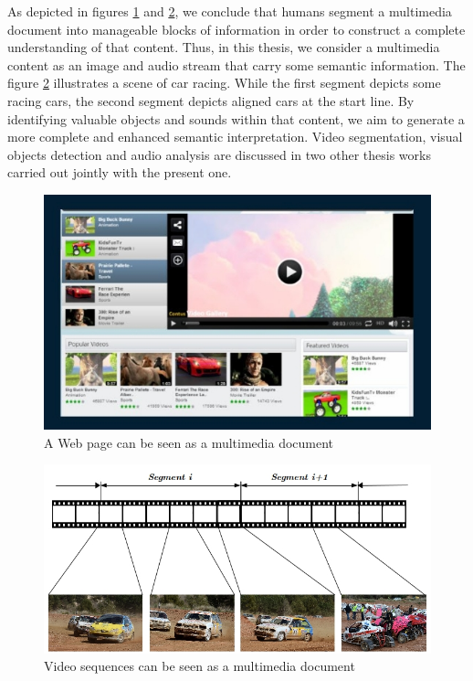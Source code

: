 	As depicted in figures \ref{state_fig2} and  \ref{state_fig3}, we conclude that humans segment a multimedia 
	document into manageable blocks of information in order to construct a complete understanding of 
	that content. Thus, in this thesis, we consider a multimedia content as an image and audio stream 
	that carry some semantic information. The figure \ref{state_fig3} illustrates a scene of car racing. 
	While the first segment depicts some racing cars, the second segment depicts aligned cars at the start 
	line. By identifying valuable objects and sounds within that content, we aim to generate a more 
	complete and enhanced semantic interpretation. Video segmentation, visual objects detection and audio 
	analysis are discussed in two other thesis works \citep{Feki2013,Elleuch2015a} 
	carried out jointly with the present one.

	\begin{figure}[ht]
		\centering
		\includegraphics[scale=0.8]{figures/state_fig3}
		\caption{A Web page can be seen as a multimedia document}
		\label{state_fig2}
	\end{figure}

	\begin{figure}[ht]
		\centering
		\includegraphics[scale=0.7]{figures/state_fig4}
		\caption{Video sequences can be seen as a multimedia document}
		\label{state_fig3}
	\end{figure}

